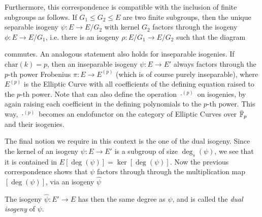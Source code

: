 Furthermore, this correspondence is compatible with the inclusion of finite subgroups as follows.
If $G_1 \leq G_2 \leq E$ are two finite subgroups, then the unique separable isogeny $\psi: E \to E/G_2$ with kernel $G_2$ factors through the isogeny $\phi: E \to E/G_1$, i.e. there is an isogeny $\rho: E/G_1 \to E/G_2$ such that the diagram
\begin{center}
\end{center}
commutes.
An analogous statement also holds for inseparable isogenies.
If $\mathrm{char}(k) = p$, then an inseparable isogeny $\psi: E \to E'$ always factors through the $p$-th power Frobenius $\pi: E \to E^{(p)}$ (which is of course purely inseparable), where $E^{(p)}$ is the Elliptic Curve with all coefficients of the defining equation raised to the $p$-th power.
Note that can also define the operation $\cdot^{(p)}$ on isogenies, by again raising each coefficient in the defining polynomials to the $p$-th power.
This way, $\cdot^{(p)}$ becomes an endofunctor on the category of Elliptic Curves over $\bar{\mathbb{F}}_p$ and their isogenies.

The final notion we require in this context is the one of the dual isogeny.
Since the kernel of an isogeny $\psi: E \to E'$ is a subgroup of size $\deg_s(\psi)$, we see that it is contained in $E[\deg(\psi)] = \ker[\deg(\psi)]$.
Now the previous correspondence shows that $\psi$ factors through through the multiplication map $[\deg(\psi)]$, via an isogeny $\hat{\psi}$
\begin{center}
\end{center}
The isogeny $\hat{\psi}: E' \to E$ has then the same degree as $\psi$, and is called the \emph{dual isogeny} of $\psi$.

